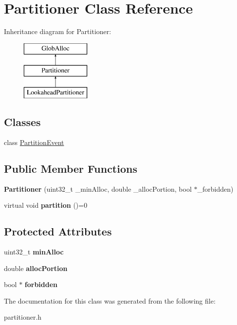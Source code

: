 \hypertarget{classPartitioner}{\section{Partitioner Class Reference}
\label{classPartitioner}
}
Inheritance diagram for Partitioner\-:\begin{figure}[H]
\begin{center}
\leavevmode
\includegraphics[height=3.000000cm]{classPartitioner}
\end{center}
\end{figure}
\subsection*{Classes}
\begin{DoxyCompactItemize}
\item 
class \hyperlink{classPartitioner_1_1PartitionEvent}{Partition\-Event}
\end{DoxyCompactItemize}
\subsection*{Public Member Functions}
\begin{DoxyCompactItemize}
\item 
\hypertarget{classPartitioner_a2a1e8ca43b42e3db3dc0575ef26cf7de}{{\bfseries Partitioner} (uint32\-\_\-t \-\_\-min\-Alloc, double \-\_\-alloc\-Portion, bool $\ast$\-\_\-forbidden)}\label{classPartitioner_a2a1e8ca43b42e3db3dc0575ef26cf7de}

\item 
\hypertarget{classPartitioner_a7d1789d773152e79142ce132ccd860a7}{virtual void {\bfseries partition} ()=0}\label{classPartitioner_a7d1789d773152e79142ce132ccd860a7}

\end{DoxyCompactItemize}
\subsection*{Protected Attributes}
\begin{DoxyCompactItemize}
\item 
\hypertarget{classPartitioner_a4b821ae6e37d1fc5ebcaffe2055975a8}{uint32\-\_\-t {\bfseries min\-Alloc}}\label{classPartitioner_a4b821ae6e37d1fc5ebcaffe2055975a8}

\item 
\hypertarget{classPartitioner_a73154e282c382e629637431630fb16a0}{double {\bfseries alloc\-Portion}}\label{classPartitioner_a73154e282c382e629637431630fb16a0}

\item 
\hypertarget{classPartitioner_a4addfe88be343fdbb98385f2d6bb1346}{bool $\ast$ {\bfseries forbidden}}\label{classPartitioner_a4addfe88be343fdbb98385f2d6bb1346}

\end{DoxyCompactItemize}


The documentation for this class was generated from the following file\-:\begin{DoxyCompactItemize}
\item 
partitioner.\-h\end{DoxyCompactItemize}
